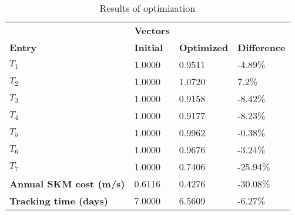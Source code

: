 \begin{table}[H]
\centering
\begin{tabular}{llll}
\textbf{}      & \cellcolor[HTML]{EFEFEF}\textbf{Vectors} & \textbf{} & \textbf{}         \\
\rowcolor[HTML]{EFEFEF} 
\textbf{Entry} & \textbf{Initial} & \textbf{Optimized} & \textbf{Difference} \\
$T_1$ & 1.0000 & 0.9511 & -4.89\% \\ 
$T_2$ & 1.0000 & 1.0720 & 7.2\% \\ 
$T_3$ & 1.0000 & 0.9158 & -8.42\% \\ 
$T_4$ & 1.0000 & 0.9177 & -8.23\% \\ 
$T_5$ & 1.0000 & 0.9962 & -0.38\% \\ 
$T_6$ & 1.0000 & 0.9676 & -3.24\% \\ 
$T_7$ & 1.0000 & 0.7406 & -25.94\% \\ 
\rowcolor[HTML]{EFEFEF} 
\textbf{Annual SKM cost (m/s)}  & 0.6116 & 0.4276 & -30.08\% \\ 
\rowcolor[HTML]{EFEFEF} 
\textbf{Tracking time (days)}  & 7.0000 & 6.5609 & -6.27\% \\ 
\end{tabular}
\caption{Results of optimization}
\label{tab:OptimizationAnalysis}
\end{table}